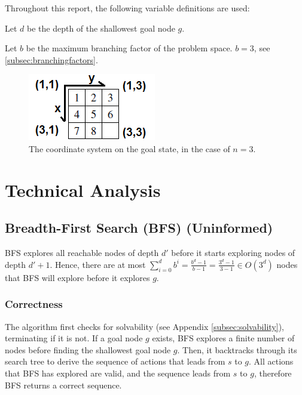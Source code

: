 \documentclass[runningheads]{llncs}
\begin{document}
Throughout this report, the following variable definitions are used:

Let $d$ be the depth of the shallowest goal node $g$.

Let $b$ be the maximum branching factor of the problem space. $b = 3$, see \ref{subsec:branchingfactors}.

\begin{figure}
	\centering
	\includegraphics{coord_system.png}
	\caption{The coordinate system on the goal state, in the case of $n=3$.} \label{fig:coordsystem}
\end{figure}



\section{Technical Analysis}

\subsection{Breadth-First Search (BFS) (Uninformed)}

BFS explores all reachable nodes of depth $d'$ before it starts exploring nodes of depth $d'+1$. Hence, there are at most $\sum_{i=0}^d b^i = \frac{b^d-1}{b-1} = \frac{3^d-1}{3-1} \in O(3^d)$ nodes that BFS will explore before it explores $g$.

\subsubsection{Correctness}
The algorithm first checks for solvability (see Appendix \ref{subsec:solvability}), terminating if it is not. If a goal node $g$ exists, BFS explores a finite number of nodes before finding the shallowest goal node $g$. Then, it backtracks through its search tree to derive the sequence of actions that leads from $s$ to $g$. All actions that BFS has explored are valid, and the sequence leads from $s$ to $g$, therefore BFS returns a correct sequence.
\end{document}

